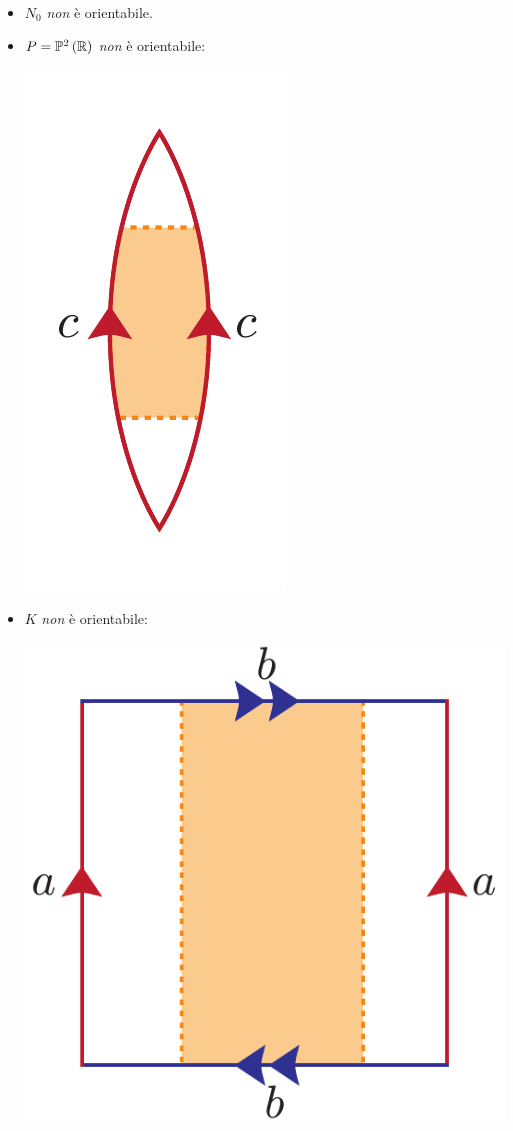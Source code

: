 \begin{examples}~{}
	\begin{itemize}
		\item $N_0$ \textit{non} è orientabile.
		\item $P=\proj[2]{\realset}$ \textit{non} è orientabile:
		\begin{center}
			\includegraphics[trim=0cm 0cm 0cm 0cm, clip, scale=0.35]{images/projmoebius.pdf}
		\end{center}
		\item $K$ \textit{non} è orientabile:
		\begin{center}
			\includegraphics[trim=0cm 0cm 0cm 0cm, clip, scale=0.35]{images/kleinmoebius.pdf}

\end{center}
\end{itemize}
\end{examples}
